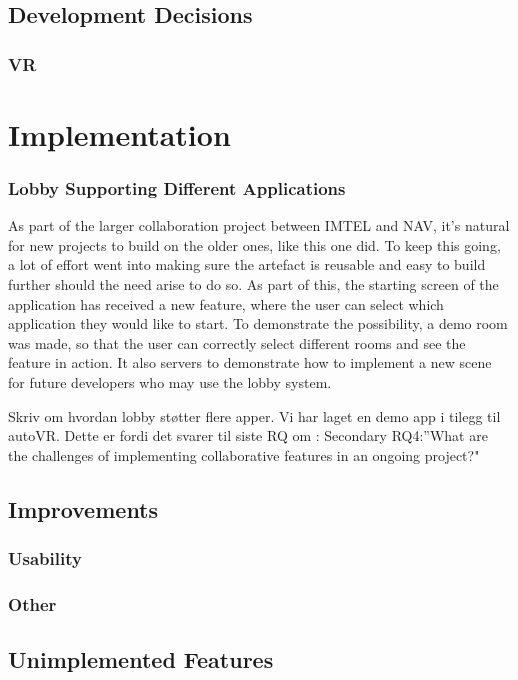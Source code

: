 \subsection{Development Decisions}
\subsubsection{VR}

\section{Implementation}

\subsubsection{Lobby Supporting Different Applications}
As part of the larger collaboration project between IMTEL and NAV, it's natural for new projects to build on the older ones, like this one did. To keep this going, a lot of effort went into making sure the artefact is reusable and easy to build further should the need arise to do so. As part of this, the starting screen of the application has received a new feature, where the user can select which application they would like to start. To demonstrate the possibility, a demo room was made, so that the user can correctly select different rooms and see the feature in action. It also servers to demonstrate how to implement a new scene for future developers who may use the lobby system.

Skriv om hvordan lobby støtter flere apper. Vi har laget en demo app i tilegg til autoVR. Dette er fordi det svarer til siste RQ om : Secondary RQ4:”What  are  the  challenges  of  implementing  collaborative  features  in  an  ongoing project?"



\subsection{Improvements}
\subsubsection{Usability}
\subsubsection{Other}

\subsection{Unimplemented Features}
